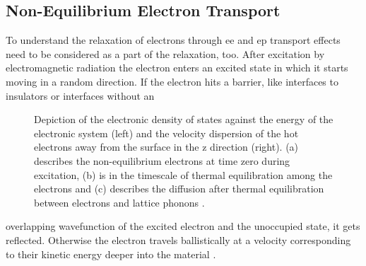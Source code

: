 \documentclass[a4paper,12pt,twoside]{article}
\begin{document}
        \subsection{Non-Equilibrium Electron Transport}
            \label{ETMchap}
To understand the relaxation of electrons through \gls{ee} and \gls{ep} transport effects need to be considered as a part of the relaxation, too. After excitation by electromagnetic radiation the electron enters an excited state in which it starts moving in a random direction. If the electron hits a barrier, like interfaces to insulators or interfaces without an%
    \begin{figure}
		\caption{Depiction of the electronic density of states against the energy of the electronic system (left) and the velocity dispersion of the hot electrons away from the surface in the z direction (right). (a) describes the non-equilibrium electrons at time zero during excitation, (b) is in the timescale of thermal equilibration among the electrons and (c) describes the diffusion after thermal equilibration between electrons and lattice phonons \cite{Hohlfeld2000}.}
		    \label{diffusion}
	\end{figure}  
 overlapping wavefunction of the excited electron and the unoccupied state, it gets reflected.
Otherwise the electron travels ballistically at a velocity corresponding to their kinetic energy deeper into the material \cite{Battiato2012}. 
\end{document}
